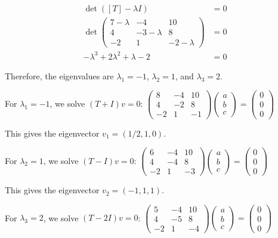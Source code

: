 \documentclass{article}
\begin{document}
\begin{align*}
    \det([T] - \lambda I) &= 0\\
    \det\begin{pmatrix} 7-\lambda & -4 & 10 \\ 4 & -3-\lambda & 8 \\ -2 & 1 & -2-\lambda \end{pmatrix} &= 0\\
    -\lambda^3 + 2\lambda^2 + \lambda - 2 &= 0
\end{align*}

Therefore, the eigenvalues are $\lambda_1 = -1$, $\lambda_2 = 1$, and $\lambda_3 = 2$.

For $\lambda_1 = -1$, we solve $(T + I)v = 0$:
$\begin{pmatrix} 8 & -4 & 10 \\ 4 & -2 & 8 \\ -2 & 1 & -1 \end{pmatrix} \begin{pmatrix} a \\ b \\ c \end{pmatrix} = \begin{pmatrix} 0 \\ 0 \\ 0 \end{pmatrix}$

This gives the eigenvector $v_1 = (1/2, 1, 0)$.

For $\lambda_2 = 1$, we solve $(T - I)v = 0$:
$\begin{pmatrix} 6 & -4 & 10 \\ 4 & -4 & 8 \\ -2 & 1 & -3 \end{pmatrix} \begin{pmatrix} a \\ b \\ c \end{pmatrix} = \begin{pmatrix} 0 \\ 0 \\ 0 \end{pmatrix}$

This gives the eigenvector $v_2 = (-1, 1, 1)$.

For $\lambda_3 = 2$, we solve $(T - 2I)v = 0$:
$\begin{pmatrix} 5 & -4 & 10 \\ 4 & -5 & 8 \\ -2 & 1 & -4 \end{pmatrix} \begin{pmatrix} a \\ b \\ c \end{pmatrix} = \begin{pmatrix} 0 \\ 0 \\ 0 \end{pmatrix}$
\end{document}

